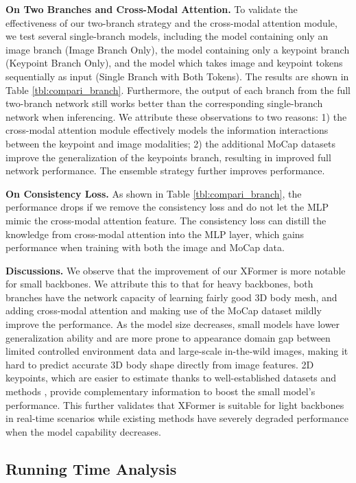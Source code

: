\documentclass{article}
\newcommand\mypara[1]{\noindent\textbf{#1}}
\begin{document}
\mypara{On Two Branches and Cross-Modal Attention.}
To validate the effectiveness of our two-branch strategy and the cross-modal attention module, we test several single-branch models, including the model containing only an image branch (Image Branch Only), the model containing only a keypoint branch (Keypoint Branch Only), and the model which takes image and keypoint tokens sequentially as input (Single Branch with Both Tokens). The results are shown in Table \ref{tbl:compari_branch}.
Furthermore, the output of each branch from the full two-branch network still works better than the corresponding single-branch network when inferencing. 
We attribute these observations to two reasons: 1) the cross-modal attention module effectively models the information interactions between the keypoint and image modalities; 2) the additional MoCap datasets improve the generalization of the keypoints branch, resulting in improved full network performance.
The ensemble strategy further improves performance.


\mypara{On Consistency Loss.} 
As shown in Table \ref{tbl:compari_branch}, the performance drops if we remove the consistency loss and do not let the MLP mimic the cross-modal attention feature. 
The consistency loss can distill the knowledge from cross-modal attention into the MLP layer, which gains performance when training with both the image and MoCap data.

\mypara{Discussions.} We observe that the improvement of our XFormer is more notable for small backbones. We attribute this to that for heavy backbones, both branches have the network capacity of learning fairly good 3D body mesh, and adding cross-modal attention and making use of the MoCap dataset mildly improve the performance. 
As the model size decreases, small models have lower generalization ability and are more prone to appearance domain gap between limited controlled environment data \cite{mehta2017monocular,von2018recovering} and large-scale in-the-wild images, making it hard to predict accurate 3D body shape directly from image features. 2D keypoints, which are easier to estimate thanks to well-established datasets and methods  \cite{cao2019openpose,bazarevsky2020blazepose}, provide complementary information to boost the small model’s performance. This further validates that XFormer is suitable for light backbones in real-time scenarios while existing methods have severely degraded performance when the model capability decreases.


\subsection{Running Time Analysis}
\label{sec:runtime}
\end{document}
